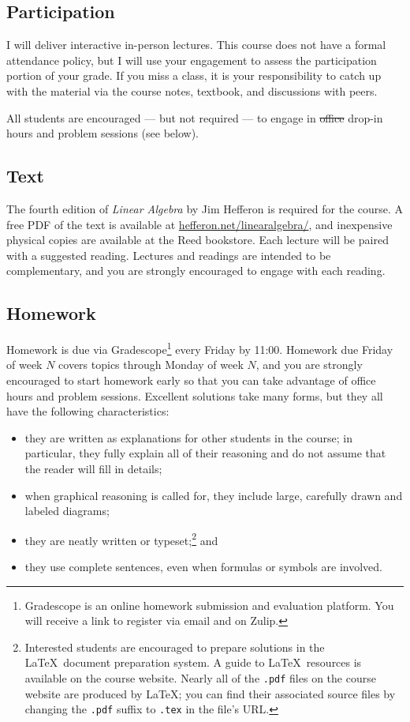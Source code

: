 \documentclass[11pt,twoside]{amsart}
\begin{document}
\subsection*{Participation}
I will deliver interactive in-person lectures. This course does not have a formal attendance policy, but I will use your engagement to assess the participation portion of your grade. If you miss a class, it is your responsibility to catch up with the material via the course notes, textbook, and discussions with peers.

All students are encouraged --- but not required --- to engage in \sout{office} drop-in hours and problem sessions (see below).

\subsection*{Text}
The fourth edition of \emph{Linear Algebra} by Jim Hefferon is required for the course.  A free PDF of the text is available at \href{https://hefferon.net/linearalgebra/}{hefferon.net/linearalgebra/}, and inexpensive physical copies are available at the Reed bookstore.  Each lecture will be paired with a suggested reading.  Lectures and readings are intended to be complementary, and you are strongly encouraged to engage with each reading.

\subsection*{Homework}
Homework is due via Gradescope\footnote{Gradescope is an online homework submission and evaluation platform. You will receive a link to register via email and on Zulip.} every Friday by 11:00. Homework due Friday of week $N$ covers topics through Monday of week $N$, and you are strongly encouraged to start homework early so that you can take advantage of office hours and problem sessions.  Excellent solutions take many forms, but they all have the following characteristics:

\begin{itemize}
\item they are written as explanations for other students in the course; in particular, they fully explain all of their reasoning and do not assume that the reader will fill in details;
\item when graphical reasoning is called for, they include large, carefully drawn and labeled diagrams;
\item they are neatly written or typeset;\footnote{Interested students are 
encouraged to prepare solutions in the \LaTeX~document preparation 
system.  A guide to \LaTeX~resources is available on the course 
website.  Nearly all of the \texttt{.pdf} files on the course website are produced by \LaTeX; you can find their associated source files by changing the \texttt{.pdf} suffix to \texttt{.tex} in the file's URL.} and
\item they use complete sentences, even when formulas or symbols are involved.
\end{itemize}
\end{document}
